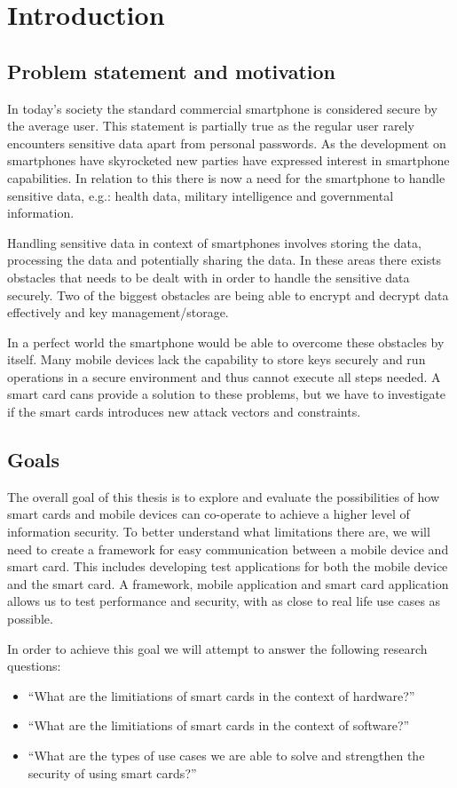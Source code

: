 \chapter{Introduction}
\section{Problem statement and motivation}
In today's society the standard commercial smartphone is considered secure by the average user. This statement is partially true as the regular user rarely encounters sensitive data apart from personal passwords. As the development on smartphones have skyrocketed new parties have expressed interest in smartphone capabilities. In relation to this there is now a need for the smartphone to handle sensitive data, e.g.: health data, military intelligence and governmental information.

Handling sensitive data in context of smartphones involves storing the data, processing the data and potentially sharing the data. In these areas there exists obstacles that needs to be dealt with in order to handle the sensitive data securely. Two of the biggest obstacles are being able to encrypt and decrypt data effectively and key management/storage.

 In a perfect world the smartphone would be able to overcome these obstacles by itself. Many mobile devices lack the capability to store keys securely and run operations in a secure environment and thus cannot execute all steps needed. A smart card cans provide a solution to these problems, but we have to investigate if the smart cards introduces new attack vectors and constraints.

\section{Goals}
\label{sec:goals}
The overall goal of this thesis is to explore and evaluate the possibilities of how smart cards and mobile devices can co-operate to achieve a higher level of information security. To better understand what limitations there are, we will need to create a framework for easy communication between a mobile device and smart card. This includes developing test applications for both the mobile device and the smart card. A framework, mobile application and smart card application allows us to test performance and security, with as close to real life use cases as possible.

In order to achieve this goal we will attempt to answer the following research questions:
\begin{itemize}
  \item ``What are the limitiations of smart cards in the context of hardware?''
  \item ``What are the limitiations of smart cards in the context of software?''
  \item ``What are the types of use cases we are able to solve and strengthen the security of using smart cards?''
\end{itemize}


